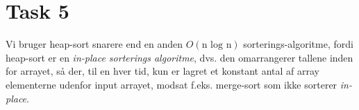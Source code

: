 \section{Task 5}

Vi bruger heap-sort snarere end en anden $O(\text{n log n})$ sorterings-algoritme, fordi heap-sort er en \textit{in-place sorterings algoritme}, dvs. den omarrangerer tallene inden for arrayet, så der, til en hver tid, kun er lagret et konstant antal af array elementerne udenfor input arrayet, modsat f.eks. merge-sort som ikke sorterer \textit{in-place}.
